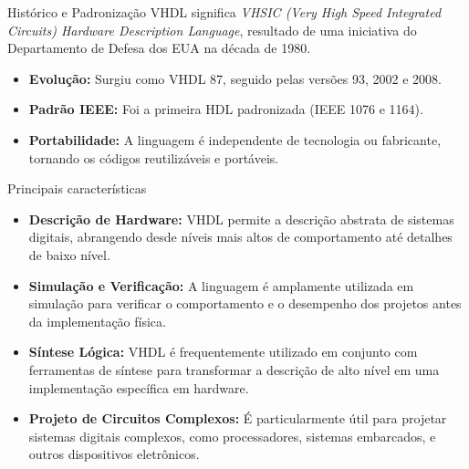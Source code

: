 \documentclass[aspectratio=169]{beamer}
\begin{document}
\begin{frame}{Histórico e Padronização}
	\justifying
	VHDL significa \textit{VHSIC (Very High Speed Integrated Circuits) Hardware Description Language}, resultado de uma iniciativa do Departamento de Defesa dos EUA na década de 1980.
	
	\begin{itemize}
		\item \textbf{Evolução:} Surgiu como VHDL 87, seguido pelas versões 93, 2002 e 2008.
		\item \textbf{Padrão IEEE:} Foi a primeira HDL padronizada (IEEE 1076 e 1164).
		\item \textbf{Portabilidade:} A linguagem é independente de tecnologia ou fabricante, tornando os códigos reutilizáveis e portáveis.
	\end{itemize}
\end{frame}









\begin{frame}{Principais características}
	\justifying
	
	\begin{itemize}
		\justifying
		\item \textbf{Descrição de Hardware:} VHDL permite a descrição abstrata de sistemas digitais, abrangendo desde níveis mais altos de comportamento até detalhes de baixo nível.
		\item \textbf{Simulação e Verificação:} A linguagem é amplamente utilizada em simulação para verificar o comportamento e o desempenho dos projetos antes da implementação física.
		\item \textbf{Síntese Lógica:} VHDL é frequentemente utilizado em conjunto com ferramentas de síntese para transformar a descrição de alto nível em uma implementação específica em hardware.
		\item \textbf{Projeto de Circuitos Complexos:} É particularmente útil para projetar sistemas digitais complexos, como processadores, sistemas embarcados, e outros dispositivos eletrônicos.
		
	\end{itemize}
	
	
\end{frame}
\end{document}
